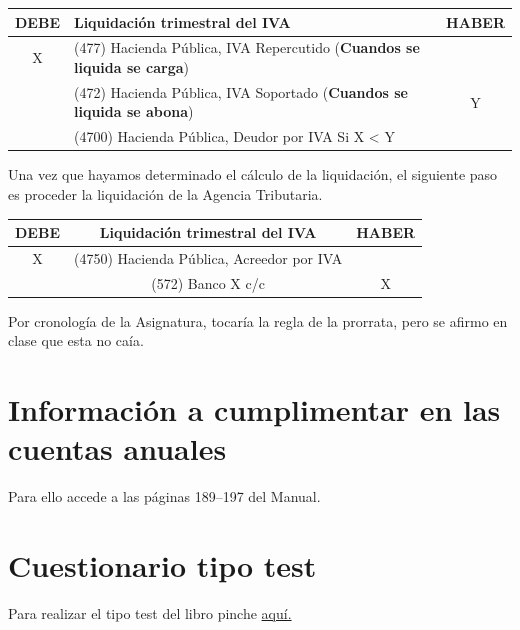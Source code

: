 \documentclass[a4paper,12pt]{article}
\begin{document}
\begin{table}[H]
    \begin{tabular}{|c|l|c|}
    \hline
    \textbf{DEBE} & \textbf{Liquidación trimestral del IVA} & \textbf{HABER} \\ \hline
    X & (477) Hacienda Pública, IVA Repercutido (\textbf{Cuandos se liquida se carga}) &  \\ \hline
     & (472) Hacienda Pública, IVA Soportado (\textbf{Cuandos se liquida se abona})& Y \\ \hline
    & (4700) Hacienda Pública, Deudor por IVA Si X < Y &  \\ \hline
    \end{tabular}
\end{table}
    
    

Una vez que hayamos determinado el cálculo de la liquidación, el siguiente paso es proceder la liquidación de la Agencia Tributaria.

\begin{table}[H]
    \begin{tabular}{|c|c|c|}
    \hline
    \textbf{DEBE} & \textbf{Liquidación trimestral del IVA} & \textbf{HABER} \\ \hline
    X & (4750) Hacienda Pública, Acreedor por IVA & \\ \hline
     &  (572) Banco X c/c & X \\ \hline
    \end{tabular}
\end{table}
    


\begin{tcolorbox}[colback=blue!5!white,colframe=blue!75!black,fonttitle=\bfseries,title=Regla de la prorrata]
    Por cronología de la Asignatura, tocaría la regla de la prorrata, pero se afirmo en clase que esta no caía.
\end{tcolorbox}

\section{Información a cumplimentar en las cuentas anuales}

Para ello accede a las páginas 189--197 del Manual.


\newpage
\section{Cuestionario tipo test}
Para realizar el tipo test del libro pinche \href{https://elblogdeismael.github.io/Subjects/Third/CF1/Tests/testT3Libro.html}{aquí.}
\end{document}
